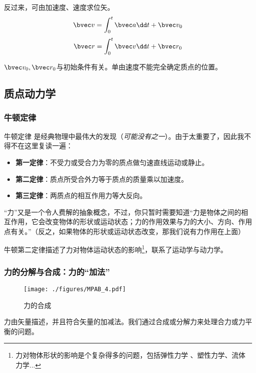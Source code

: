 反过来，可由加速度、速度求位矢。
$$
\bvec v = \int^{t}_0\bvec a \dd t + \bvec v_0
$$
$$
\bvec r = \int^{t}_0\bvec v \dd t + \bvec r_0
$$

$\bvec v_0, \bvec r_0$与初始条件有关。单由速度不能完全确定质点的位置。


\subsection{质点动力学}

\subsubsection{牛顿定律}
牛顿定律 是经典物理中最伟大的发现（\textsl{可能没有之一}）。由于太重要了，因此我不得不在这里复读一遍：

\begin{itemize}
\item \textbf{第一定律}：不受力或受合力为零的质点做匀速直线运动或静止。
\item \textbf{第二定律}：质点所受合外力等于质点的质量乘以加速度。
\item \textbf{第三定律}：两质点的相互作用力等大反向。
\end{itemize}

“力”又是一个令人费解的抽象概念，不过，你只暂时需要知道“力是物体之间的相互作用，它会改变物体的形状或运动状态；力的作用效果与力的大小、方向、作用点有关。”（反之，如果物体的形状或运动状态改变，那我们说有力作用在上面）

牛顿第二定律描述了力对物体运动状态的影响\footnote{力对物体形状的影响是个复杂得多的问题，包括弹性力学 、塑性力学、流体力学...}，联系了运动学与动力学。

\subsubsection{力的分解与合成：力的“加法”}
\begin{figure}[ht]
\centering
\texttt{[image: ./figures/MPAB\_4.pdf]}
\caption{力的合成} \label{MPAB_fig4}
\end{figure}
力由矢量描述，并且符合矢量的加减法。我们通过合成或分解力来处理合力或力平衡的问题。

